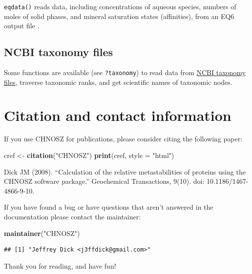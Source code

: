 \documentclass[]{tufte-handout}
\newenvironment{Shaded}{}{}
\newcommand{\KeywordTok}[1]{\textcolor[rgb]{0.00,0.44,0.13}{\textbf{#1}}}
\newcommand{\DataTypeTok}[1]{\textcolor[rgb]{0.56,0.13,0.00}{#1}}
\newcommand{\StringTok}[1]{\textcolor[rgb]{0.25,0.44,0.63}{#1}}
\newcommand{\NormalTok}[1]{#1}
\begin{document}
{\texttt{eqdata()}} reads data, including concentrations of aqueous
species, numbers of moles of solid phases, and mineral saturation states
(affinities), from an EQ6 output file \citep{Wol92}.

\subsection{NCBI taxonomy files}\label{ncbi-taxonomy-files}

Some functions are available (see {\texttt{?taxonomy}}) to read data
from \href{ftp://ftp.ncbi.nih.gov/pub/taxonomy/}{NCBI taxonomy files},
traverse taxonomic ranks, and get scientific names of taxonomic nodes.

\section{Citation and contact
information}\label{citation-and-contact-information}

If you use CHNOSZ for publications, please consider citing the following
paper:

\begin{Shaded}
\begin{Highlighting}[]
\NormalTok{cref <-}\StringTok{ }\KeywordTok{citation}\NormalTok{(}\StringTok{"CHNOSZ"}\NormalTok{)}
\KeywordTok{print}\NormalTok{(cref, }\DataTypeTok{style =} \StringTok{"html"}\NormalTok{)}
\end{Highlighting}
\end{Shaded}

Dick JM (2008). ``Calculation of the relative metastabilities of
proteins using the CHNOSZ software package.'' Geochemical Transactions,
9(10). doi: 10.1186/1467-4866-9-10.

If you have found a bug or have questions that aren't answered in the
documentation please contact the maintainer:

\begin{Shaded}
\begin{Highlighting}[]
\KeywordTok{maintainer}\NormalTok{(}\StringTok{"CHNOSZ"}\NormalTok{)}
\end{Highlighting}
\end{Shaded}

\begin{verbatim}
## [1] "Jeffrey Dick <j3ffdick@gmail.com>"
\end{verbatim}

Thank you for reading, and have fun!
\end{document}
